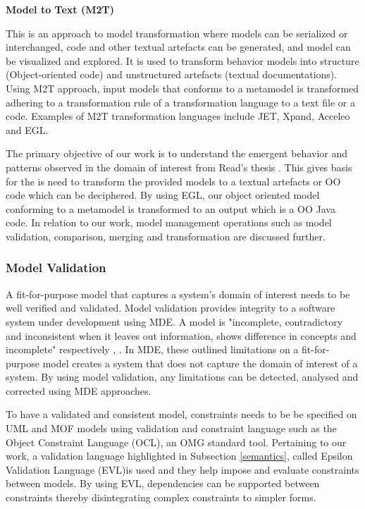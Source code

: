 \documentclass[12pt, a4paper]{report}
\begin{document}
\textbf{Model to Text (M2T)}

This is an approach to model transformation where models can be serialized or interchanged, code and other textual artefacts can be generated, and model can be visualized and explored. It is used to transform behavior models into structure (Object-oriented code) and unstructured artefacts (textual documentations). Using M2T approach, input models that conforms to a metamodel is transformed adhering to a transformation rule of a transformation language to a text file or a code. Examples of M2T transformation languages include JET, Xpand, Acceleo and EGL. 

The primary objective of our work is to understand the emergent behavior and patterns observed in the domain of interest from Read's thesis \cite{Read2011}. This gives basis for the is need to transform the provided models to a textual artefacts or OO code which can be deciphered. By using EGL, our object oriented model conforming to a metamodel is transformed to an output which is a OO Java code. In relation to our work, model management operations such as model validation, comparison, merging and transformation are discussed further.

\subsubsection{Model Validation}
A fit-for-purpose model that captures a system's domain of interest needs to be well verified and validated. Model validation provides integrity to a software system under development using MDE. A model is "incomplete, contradictory and inconsistent when it leaves out information, shows difference in concepts and incomplete" respectively \cite{Kolovos2009}, \cite{Elaasar2004}. In MDE, these outlined limitations on a fit-for-purpose model creates a system that does not capture the domain of interest of a system. By using model validation, any limitations can be detected, analysed and corrected using MDE approaches.

To have a validated and consistent model, constraints needs to be be specified on UML and MOF models using validation and constraint language such as the Object Constraint Language (OCL), an OMG standard tool. Pertaining to our work, a validation language highlighted in Subsection \ref{semantics}, called Epsilon Validation Language (EVL)is used and they help impose and evaluate constraints between models. By using EVL, dependencies can be supported between constraints thereby disintegrating complex constraints to simpler forms.
\end{document}

